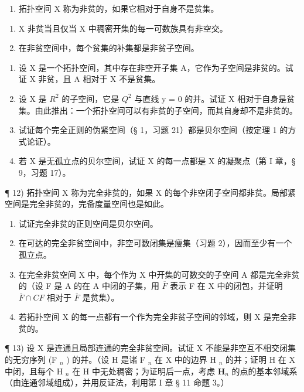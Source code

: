 \begin{enumerate}
\def\labelenumi{\arabic{enumi})}
\setcounter{enumi}{6}
\tightlist
\item
  拓扑空间 X 称为非贫的，如果它相对于自身不是贫集。
\end{enumerate}

\begin{enumerate}
\def\labelenumi{\alph{enumi})}
\item
  X 非贫当且仅当 X 中稠密开集的每一可数族具有非空交。
\item
  在非贫空间中，每个贫集的补集都是非贫子空间。
\end{enumerate}

\begin{enumerate}
\def\labelenumi{\arabic{enumi})}
\setcounter{enumi}{7}
\item
  设 X 是一个拓扑空间，其中存在非空开子集 A，它作为子空间是非贫的。试证 X 非贫，且 A 相对于 X 不是贫集。
\item
  设 X 是 \(R^{2}\) 的子空间，它是 \(Q^{2}\) 与直线 y = 0 的并。试证 X 相对于自身是贫集。由此推出：一个拓扑空间可以有非贫的子空间，而其自身却不是非贫的。
\item
  试证每个完全正则的伪紧空间（§ 1，习题 21）都是贝尔空间（按定理 1 的方式论证）。
\item
  若 X 是无孤立点的贝尔空间，试证 X 的每一点都是 X 的凝聚点（第 I 章，§ 9，习题 17）。
\end{enumerate}

¶ 12) 拓扑空间 X 称为完全非贫的，如果 X 的每个非空闭子空间都非贫。局部紧空间是完全非贫的，完备度量空间也是如此。

\begin{enumerate}
\def\labelenumi{\alph{enumi})}
\item
  试证完全非贫的正则空间是贝尔空间。
\item
  在可达的完全非贫空间中，非空可数闭集是瘦集（习题 2），因而至少有一个孤立点。
\item
  在完全非贫空间 X 中，每个作为 X 中开集的可数交的子空间 A 都是完全非贫的（设 F 是 A 的在 A 中闭的子集，用 \(\overline{F}\) 表示 F 在 X 中的闭包，并证明 \(\overline{F} \cap C F\) 相对于 \(\overline{F}\) 是贫集）。
\item
  若拓扑空间 X 的每一点都有一个作为完全非贫子空间的邻域，则 X 是完全非贫的。
\end{enumerate}

¶ 13) 设 X 是连通且局部连通的完全非贫空间。试证 X 不能是非空互不相交闭集的无穷序列 (F \(_{n}\) ) 的并。（设 H 是诸 F \(_{n}\) 在 X 中的边界 H \(_{n}\) 的并；证明 H 在 X 中闭，且每个 H \(_{n}\) 在 H 中无处稠密；为证明后一点，考虑 \(\mathbf{H}_n\) 的点的基本邻域系（由连通邻域组成），并用反证法，利用第 I 章 § 11 命题 3。）

